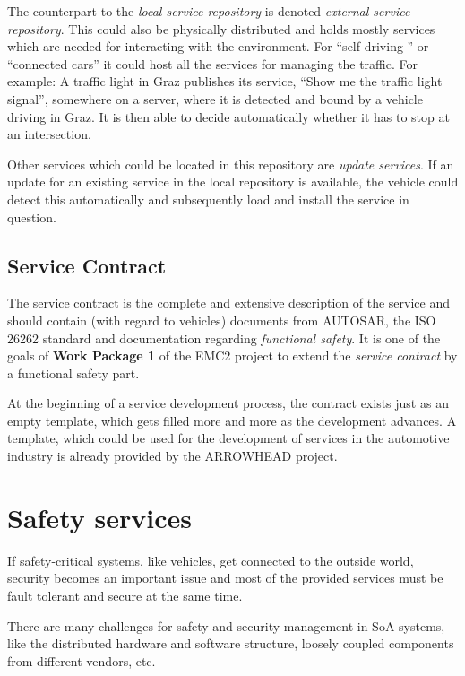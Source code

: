 The counterpart to the \emph{local service repository} is denoted \emph{external service repository}. This could also be physically distributed and holds mostly services which are needed for interacting with the environment. For ``self-driving-'' or ``connected cars'' it could host all the services for managing the traffic. For example: A traffic light in Graz publishes its service, ``Show me the traffic light signal'', somewhere on a server, where it is detected and bound by a vehicle driving in Graz. It is then able to decide automatically whether it has to stop at an intersection.

Other services which could be located in this repository are \emph{update services}. If an update for an existing service in the local repository is available, the vehicle could detect this automatically and subsequently load and install the service in question.


\subsection{Service Contract}

The service contract is the complete and extensive description of the service and should contain (with regard to vehicles) documents from AUTOSAR, the ISO 26262 standard and documentation regarding \emph{functional safety}. It is one of the goals of \textbf{Work Package 1} of the EMC2 project to extend the \emph{service contract} by a functional safety part.

At the beginning of a service development process, the contract exists just as an empty template, which gets filled more and more as the development advances. A template, which could be used for the development of services in the automotive industry is already provided by the ARROWHEAD project.








\section{Safety services}

If safety-critical systems, like vehicles, get connected to the outside world, security becomes an important issue and most of the provided services must be fault tolerant and secure at the same time.

There are many challenges for safety and security management in SoA systems, like the distributed hardware and software structure, loosely coupled components from different vendors, etc.


